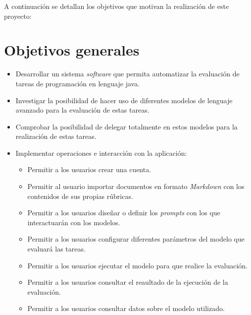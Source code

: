 
A continuación se detallan los objetivos que motivan la realización de este proyecto:

\section{Objetivos generales}\label{objetivos_generales}

\begin{itemize}
    \item Desarrollar un sistema \textit{software} que permita automatizar la evaluación de tareas de programación en lenguaje java.
    \item Investigar la posibilidad de hacer uso de diferentes modelos de lenguaje avanzado para la evaluación de estas tareas.
    \item Comprobar la posibilidad de delegar totalmente en estos modelos para la realización de estas tareas.
    \item Implementar operaciones e interacción con la aplicación:
    \begin{itemize}
        \item Permitir a los usuarios crear una cuenta.
        \item Permitir al usuario importar documentos en formato \textit{Markdown} con los contenidos de sus propias rúbricas.
        \item Permitir a los usuarios diseñar o definir los \textit{prompts} con los que interactuarán con los modelos.
        \item Permitir a los usuarios configurar diferentes parámetros del modelo que evaluará las tareas.
        \item Permitir a los usuarios ejecutar el modelo para que realice la evaluación.
        \item Permitir a los usuarios consultar el reaultado de la ejecución de la evaluación.
        \item Permitir a los usuarios consultar datos sobre el modelo utilizado.
    \end{itemize}
\end{itemize}

